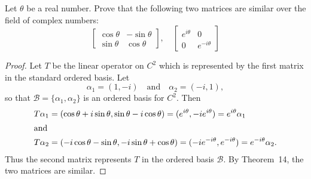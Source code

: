  Let $\theta$ be a real number. Prove that the following two
matrices are similar over the field of complex numbers:
\begin{equation*}
  \begin{bmatrix}
    \cos\theta & -\sin\theta \\
    \sin\theta & \cos\theta
  \end{bmatrix},
  \quad
  \begin{bmatrix}
    e^{i\theta} & 0 \\
    0 & e^{-i\theta}
  \end{bmatrix}
\end{equation*}
\begin{proof}
  Let $T$ be the linear operator on $C^2$ which is represented by the
  first matrix in the standard ordered basis. Let
  \begin{equation*}
    \alpha_1 = (1, -i) \quad\text{and}\quad \alpha_2 = (-i, 1),
  \end{equation*}
  so that $\mathcal{B} = \{\alpha_1,\alpha_2\}$ is an ordered basis
  for $C^2$. Then
  \begin{align*}
    T\alpha_1
    &= (\cos\theta + i\sin\theta, \sin\theta - i\cos\theta)
      = (e^{i\theta}, -ie^{i\theta}) = e^{i\theta}\alpha_1
    \\\intertext{and}
    T\alpha_2
    &= (-i\cos\theta - \sin\theta, -i\sin\theta + \cos\theta)
      = (-ie^{-i\theta}, e^{-i\theta}) = e^{-i\theta}\alpha_2.
  \end{align*}
  Thus the second matrix represents $T$ in the ordered basis
  $\mathcal{B}$. By Theorem~14, the two matrices are similar.
\end{proof}

